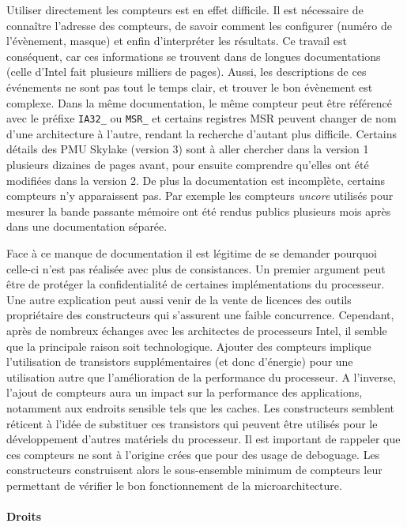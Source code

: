         Utiliser directement les compteurs est en effet difficile. Il est nécessaire de connaître l'adresse des compteurs, de savoir comment les configurer (numéro de l'évènement, masque) et enfin d'interpréter les résultats. Ce travail est conséquent, car ces informations se trouvent dans de longues documentations (celle d'Intel fait plusieurs milliers de pages). Aussi, les descriptions de ces événements ne sont pas tout le temps clair, et trouver le bon évènement est complexe. Dans la même documentation, le même compteur peut être référencé avec le préfixe \verb=IA32_= ou \verb=MSR_= et certains registres MSR peuvent changer de nom d'une architecture à l'autre, rendant la recherche d'autant plus difficile. Certains détails des PMU Skylake (version 3) sont à aller chercher dans la version 1 plusieurs dizaines de pages avant, pour ensuite comprendre qu'elles ont été modifiées dans la version 2. De plus la documentation est incomplète, certains compteurs n'y apparaissent pas. Par exemple les compteurs \textit{uncore} utilisés pour mesurer la bande passante mémoire ont été rendus publics plusieurs mois après dans une documentation séparée.
  
        Face à ce manque de documentation il est légitime de se demander pourquoi celle-ci n'est pas réalisée avec plus de consistances. Un premier argument  peut être de protéger la confidentialité de certaines implémentations du processeur. Une autre explication peut aussi venir de la vente de licences des outils propriétaire des constructeurs qui s'assurent une faible concurrence. Cependant, après de nombreux échanges avec les architectes de processeurs Intel, il semble que la principale raison soit technologique. Ajouter des compteurs implique l'utilisation de transistors supplémentaires (et donc d'énergie) pour une utilisation autre que l'amélioration de la performance du processeur. A l'inverse, l'ajout de compteurs aura un impact sur la performance des applications, notamment aux endroits sensible tels que les caches. Les constructeurs semblent réticent à l'idée de substituer ces transistors qui peuvent être utilisés pour le développement d'autres matériels du processeur. Il est important de rappeler que ces compteurs ne sont à l'origine crées que pour des usage de deboguage. Les constructeurs construisent alors le sous-ensemble minimum de compteurs leur permettant de vérifier le bon fonctionnement de la microarchitecture.
  
    \paragraph{Droits}
    
